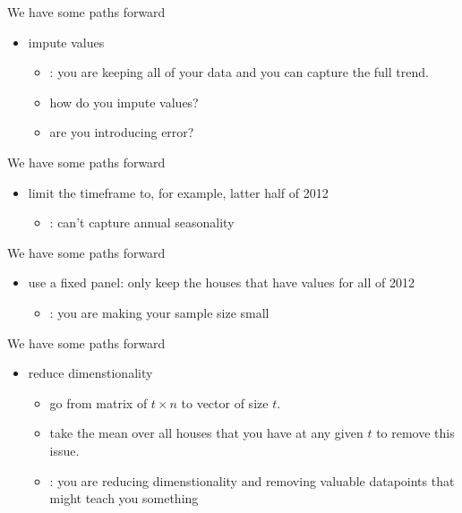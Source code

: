 \documentclass{beamer}
\begin{document}
\begin{frame}{We have some paths forward}
  \begin{itemize}
    \item<+-> impute values
    \begin{itemize}
      \item<+-> {\color{green}{pro}}: you are keeping all of your data and you can capture the full trend.
      \item<+-> how do you impute values?
      \item<+-> are you introducing error?
    \end{itemize}
  \end{itemize}
\end{frame}

\begin{frame}{We have some paths forward}
  \begin{itemize}
    \item<+-> limit the timeframe to, for example, latter half of 2012
    \begin{itemize}
      \item<+-> {\color{red}{con}}: can't capture annual seasonality
    \end{itemize}
  \end{itemize}
\end{frame}

\begin{frame}{We have some paths forward}
  \begin{itemize}
    \item<+-> use a fixed panel: only keep the houses that have values for all of 2012
    \begin{itemize}
      \item<+-> {\color{red}{con}}: you are making your sample size small
    \end{itemize}
  \end{itemize}
\end{frame}

\begin{frame}{We have some paths forward}
  \begin{itemize}
    \item<+-> reduce dimenstionality
    \begin{itemize}
      \item<+-> go from matrix of $t \times n$ to vector of size $t$.
      \item<+-> take the mean over all houses that you have at any given $t$ to remove this issue.
      \item<+-> {\color{red}{con}}: you are reducing dimenstionality and removing valuable datapoints that might teach you something
    \end{itemize}
  \end{itemize}
\end{frame}
\end{document}
